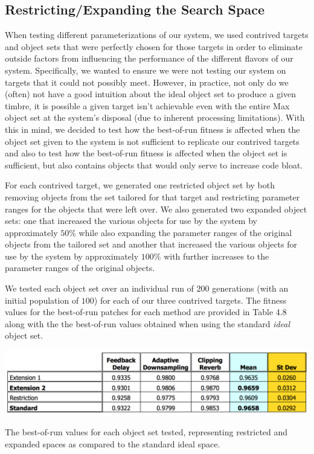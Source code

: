 \documentclass[a4paper,12pt]{report} 	%
\numberwithin{figure}{chapter}
\numberwithin{table}{chapter}
\numberwithin{equation}{chapter}
\begin{document}
\begin{flushleft}
\section{Restricting/Expanding the Search Space}
When testing different parameterizations of our system, we used contrived targets and object sets that were perfectly chosen for those targets in order to eliminate outside factors from influencing the performance of the different flavors of our system. Specifically, we wanted to ensure we were not testing our system on targets that it could not possibly meet. However, in practice, not only do we (often) not have a good intuition about the ideal object set to produce a given timbre, it is possible a given target isn't achievable even with the entire Max object set at the system's disposal (due to inherent processing limitations). With this in mind, we decided to test how the best-of-run fitness is affected when the object set given to the system is not sufficient to replicate our contrived targets and also to test how the best-of-run fitness is affected when the object set is sufficient, but also contains objects that would only serve to increase code bloat.

For each contrived target, we generated one restricted object set by both removing objects from the set tailored for that target and restricting parameter ranges for the objects that were left over. We also generated two expanded object sets: one that increased the various objects for use by the system by approximately $50\%$ while also expanding the parameter ranges of the original objects from the tailored set and another that increased the various objects for use by the system by approximately $100\%$ with further increases to the parameter ranges of the original objects.

We tested each object set over an individual run of $200$ generations (with an initial population of $100$) for each of our three contrived targets. The fitness values for the best-of-run patches for each method are provided in Table 4.8 along with the the best-of-run values obtained when using the standard \emph{ideal} object set.

\begin{table}[h!]
\begin{center}
\includegraphics[scale=0.6,width=\linewidth]{ExpansionRestrictionTable}
\caption[Restriction/Expansion Best-of-Run Values]{The best-of-run values for each object set tested, representing restricted and expanded spaces as compared to the standard ideal space.}
\end{center}
\end{table}


\end{flushleft}
\end{document}

